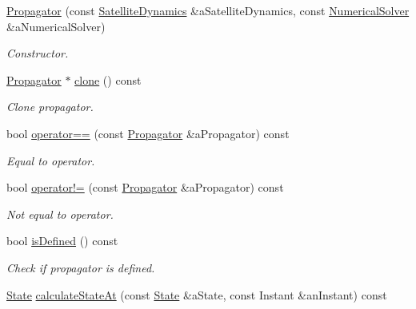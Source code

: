 \begin{DoxyCompactItemize}
\item 
\hyperlink{classostk_1_1astro_1_1trajectory_1_1_propagator_a3e3802b0eaa96a0e9422db11a7deac16}{Propagator} (const \hyperlink{classostk_1_1astro_1_1flight_1_1system_1_1dynamics_1_1_satellite_dynamics}{Satellite\+Dynamics} \&a\+Satellite\+Dynamics, const \hyperlink{classostk_1_1astro_1_1_numerical_solver}{Numerical\+Solver} \&a\+Numerical\+Solver)
\begin{DoxyCompactList}\small\item\em Constructor. \end{DoxyCompactList}\item 
\hyperlink{classostk_1_1astro_1_1trajectory_1_1_propagator}{Propagator} $\ast$ \hyperlink{classostk_1_1astro_1_1trajectory_1_1_propagator_a9b21848949fad6f4f3f612a91c5c9106}{clone} () const
\begin{DoxyCompactList}\small\item\em Clone propagator. \end{DoxyCompactList}\item 
bool \hyperlink{classostk_1_1astro_1_1trajectory_1_1_propagator_aa16a98d76cd120299dd62e2f1e1c9bb9}{operator==} (const \hyperlink{classostk_1_1astro_1_1trajectory_1_1_propagator}{Propagator} \&a\+Propagator) const
\begin{DoxyCompactList}\small\item\em Equal to operator. \end{DoxyCompactList}\item 
bool \hyperlink{classostk_1_1astro_1_1trajectory_1_1_propagator_a2f4ddff27e509435d7d512f5fefc10c7}{operator!=} (const \hyperlink{classostk_1_1astro_1_1trajectory_1_1_propagator}{Propagator} \&a\+Propagator) const
\begin{DoxyCompactList}\small\item\em Not equal to operator. \end{DoxyCompactList}\item 
bool \hyperlink{classostk_1_1astro_1_1trajectory_1_1_propagator_a52140a4499899dda02e5c73179975e53}{is\+Defined} () const
\begin{DoxyCompactList}\small\item\em Check if propagator is defined. \end{DoxyCompactList}\item 
\hyperlink{classostk_1_1astro_1_1trajectory_1_1_state}{State} \hyperlink{classostk_1_1astro_1_1trajectory_1_1_propagator_aa0fde78b62924b7cf1eb81bf80bff165}{calculate\+State\+At} (const \hyperlink{classostk_1_1astro_1_1trajectory_1_1_state}{State} \&a\+State, const Instant \&an\+Instant) const

\end{DoxyCompactItemize}
